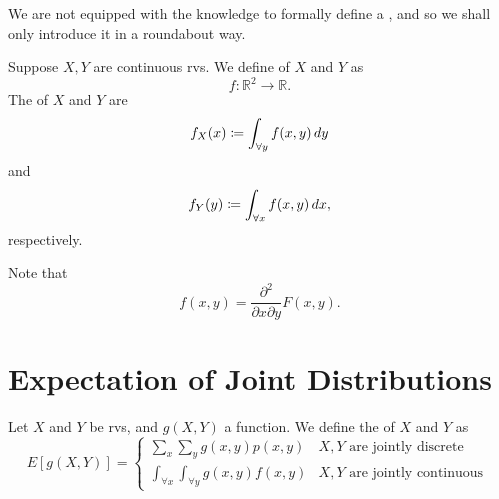 \documentclass[notoc,notitlepage]{tufte-book}
\begin{document}
We are not equipped with the knowledge to formally define a , and so we shall only introduce it in a roundabout way.

\begin{defn}\label{defn:joint_pdf}
  Suppose $X, Y$ are continuous rvs. We define  of $X$ and $Y$ as
  \begin{equation*}
    f : \mathbb{R}^2 \to \mathbb{R}.
  \end{equation*}
  The  of $X$ and $Y$ are
  \begin{equation*}
    f_X(x) \coloneqq \int_{\forall y} f(x, y) \mathop{}\!d{y}
  \end{equation*}
  and
  \begin{equation*}
    f_Y(y) \coloneqq \int_{\forall x} f(x, y) \mathop{}\!d{x},
  \end{equation*}
  respectively.
\end{defn}

\begin{note}
  Note that
  \begin{equation*}
    f(x, y) = \frac{\partial^2}{\partial x \partial y} F(x, y).
  \end{equation*}
\end{note}

\section{Expectation of Joint Distributions}%
\label{sec:expectation_of_joint_distributions}

\begin{defn}\label{defn:expectation_of_joint_distributions}
  Let $X$ and $Y$ be rvs, and $g(X, Y)$ a function. We define the
   of $X$ and $Y$ as
  \begin{equation*}
    E[g(X, Y)] = \begin{cases}
      \sum_{x} \sum_{y} g(x, y) p(x, y) & X, Y \text{ are jointly discrete } \\
      \int_{\forall x} \int_{\forall y} g(x, y) f(x, y) & X, Y \text{ are jointly continuous }
    \end{cases}
  \end{equation*}
\end{defn}
\end{document}
